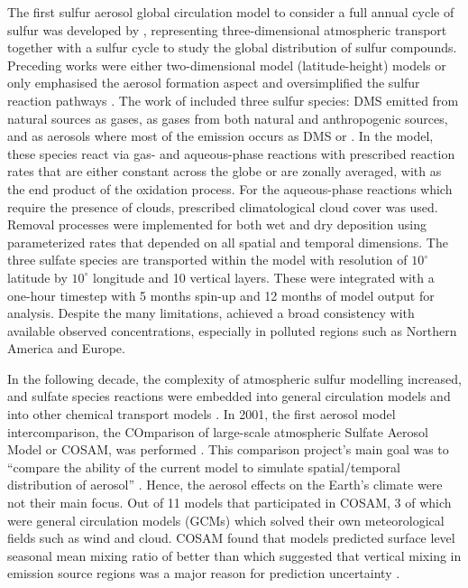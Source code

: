 The first sulfur aerosol global circulation model to consider a full annual cycle of sulfur was developed by \citet{langnerGlobalThreedimensionalModel1991}, representing three-dimensional atmospheric transport together with a sulfur cycle to study the global distribution of sulfur compounds. Preceding works were either two-dimensional model (latitude-height) models \citep{rodheGlobalDistributionSulfur1980} or only emphasised the aerosol formation aspect and oversimplified the sulfur reaction pathways \citep{ericksoniiiGlobalOceantoatmosphereDimethyl1990}. The work of \citet{langnerGlobalThreedimensionalModel1991} included three sulfur species: DMS emitted from natural sources as gases,  as gases from both natural and anthropogenic sources, and  as aerosols where most of the emission occurs as DMS or . In the model, these species react via gas- and aqueous-phase reactions with prescribed reaction rates that are either constant across the globe or are zonally averaged, with  as the end product of the oxidation process. For the aqueous-phase reactions which require the presence of clouds, prescribed climatological cloud cover was used. Removal processes were implemented for both wet and dry deposition using parameterized rates that depended on all spatial and temporal dimensions. The three sulfate species are transported within the model with resolution of $10^\circ$ latitude by $10^\circ$ longitude and 10 vertical layers. These were integrated with a one-hour timestep with 5 months spin-up and 12 months of model output for analysis. Despite the many limitations, \citet{langnerGlobalThreedimensionalModel1991} achieved a broad consistency with available observed concentrations, especially in polluted regions such as Northern America and Europe.

In the following decade, the complexity of atmospheric sulfur modelling increased, and sulfate species reactions were embedded into general circulation models and into other chemical transport models \citep[e.g.][]{kochTroposphericSulfurSimulation1999}.  In 2001, the first aerosol model intercomparison, the COmparison of large-scale atmospheric Sulfate Aerosol Model or COSAM, was performed  \citep{barrieComparisonLargescaleAtmospheric2001, lohmannVerticalDistributionsSulfur2001, roelofsAnalysisRegionalBudgets2001}. This comparison project’s main goal was to “compare the ability of the current model to simulate spatial/temporal distribution of aerosol” \citep{barrieComparisonLargescaleAtmospheric2001}. Hence, the aerosol effects on the Earth’s climate were not their main focus.  Out of 11 models that participated in COSAM, 3 of which were general circulation models (GCMs) which solved their own meteorological fields such as wind and cloud. COSAM found that models predicted surface level seasonal mean mixing ratio of  better than  which suggested that vertical mixing in emission source regions was a major reason for prediction uncertainty \citep{lohmannVerticalDistributionsSulfur2001}. 

